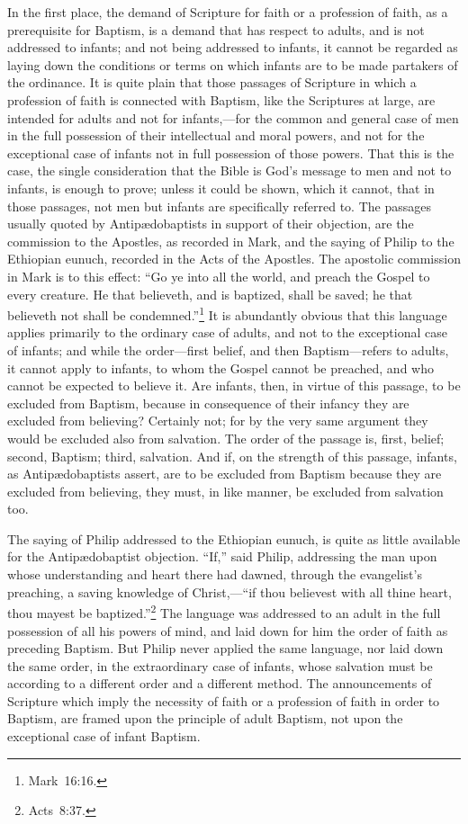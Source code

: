 \documentclass[
  english,
]{book}
\begin{document}
In the first place, the demand of Scripture for faith or a profession of faith, as a prerequisite for Baptism, is a demand that has respect to adults, and is not addressed to infants; and not being addressed to infants, it cannot be regarded as laying down the conditions or terms on which infants are to be made partakers of the ordinance. It is quite plain that those passages of Scripture in which a profession of faith is connected with Baptism, like the Scriptures at large, are intended for adults and not for infants,---for the common and general case of men in the full possession of their intellectual and moral powers, and not for the exceptional case of infants not in full possession of those powers. That this is the case, the single consideration that the Bible is God's message to men and not to infants, is enough to prove; unless it could be shown, which it cannot, that in those passages, not men but infants are specifically referred to. The passages usually quoted by Antipædobaptists in support of their objection, are the commission to the Apostles, as recorded in Mark, and the saying of Philip to the Ethiopian eunuch, recorded in the Acts of the Apostles. The apostolic commission in Mark is to this effect: ``Go ye into all the world, and preach the Gospel to every creature. He that believeth, and is baptized, shall be saved; he that believeth not shall be condemned.''\footnote{Mark~16:16.} It is abundantly obvious that this language applies primarily to the ordinary case of adults, and not to the exceptional case of infants; and while the order---first belief, and then Baptism---refers to adults, it cannot apply to infants, to whom the Gospel cannot be preached, and who cannot be expected to believe it. Are infants, then, in virtue of this passage, to be excluded from Baptism, because in consequence of their infancy they are excluded from believing? Certainly not; for by the very same argument they would be excluded also from salvation. The order of the passage is, first, belief; second, Baptism; third, salvation. And if, on the strength of this passage, infants, as Antipædobaptists assert, are to be excluded from Baptism because they are excluded from believing, they must, in like manner, be excluded from salvation too.

The saying of Philip addressed to the Ethiopian eunuch, is quite as little available for the Antipædobaptist objection. ``If,'' said Philip, addressing the man upon whose understanding and heart there had dawned, through the evangelist's preaching, a saving knowledge of Christ,---``if thou believest with all thine heart, thou mayest be baptized.''\footnote{Acts~8:37.} The language was addressed to an adult in the full possession of all his powers of mind, and laid down for him the order of faith as preceding Baptism. But Philip never applied the same language, nor laid down the same order, in the extraordinary case of infants, whose salvation must be according to a different order and a different method. The announcements of Scripture which imply the necessity of faith or a profession of faith in order to Baptism, are framed upon the principle of adult Baptism, not upon the exceptional case of infant Baptism.
\end{document}
